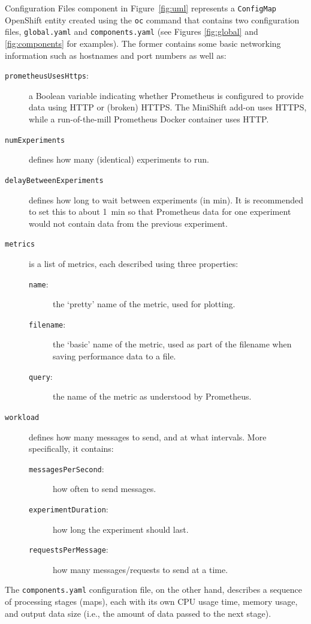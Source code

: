 \documentclass{article}
\begin{document}
Configuration Files component in Figure~\ref{fig:uml} represents a
\texttt{ConfigMap} OpenShift entity created using the \texttt{oc} command that
contains two configuration files, \texttt{global.yaml} and
\texttt{components.yaml} (see Figures \ref{fig:global} and \ref{fig:components}
for examples). The former contains some basic networking information such as
hostnames and port numbers as well as:
\begin{description}
\item[\texttt{prometheusUsesHttps}:] a Boolean variable indicating whether
  Prometheus is configured to provide data using HTTP or (broken) HTTPS. The
  MiniShift add-on uses HTTPS, while a run-of-the-mill Prometheus Docker
  container uses HTTP.
\item[\texttt{numExperiments}] defines how many (identical) experiments to run.
\item[\texttt{delayBetweenExperiments}] defines how long to wait between
  experiments (in \si{\minute}). It is recommended to set this to about
  \SI{1}{\minute} so that Prometheus data for one experiment would not contain
  data from the previous experiment.
\item[\texttt{metrics}] is a list of metrics, each described using three
  properties:
  \begin{description}
  \item[\texttt{name}:] the `pretty' name of the metric, used for plotting.
  \item[\texttt{filename}:] the `basic' name of the metric, used as part of the
    filename when saving performance data to a file.
  \item[\texttt{query}:] the name of the metric as understood by Prometheus.
  \end{description}
\item[\texttt{workload}] defines how many messages to send, and at what
  intervals. More specifically, it contains:
  \begin{description}
  \item[\texttt{messagesPerSecond}:] how often to send messages.
  \item[\texttt{experimentDuration}:] how long the experiment should
    last.
  \item[\texttt{requestsPerMessage}:] how many messages/requests to send
    at a time.
  \end{description}
\end{description}

The \texttt{components.yaml} configuration
file, on the other hand, describes a sequence of processing stages (maps), each
with its own CPU usage time, memory usage, and output data size (i.e., the
amount of data passed to the next stage).
\end{document}
